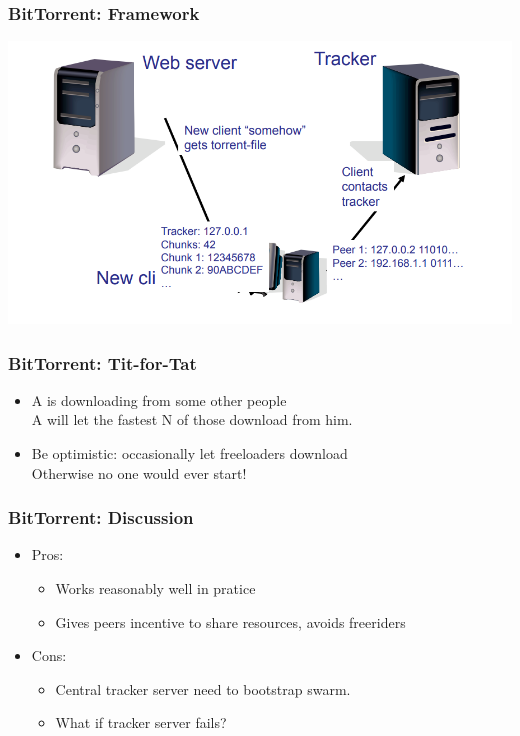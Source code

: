 \begin{frame}
    \frametitle{BitTorrent: Framework}
    \includegraphics[scale=0.3]{figures/bittorrent2.png}
\end{frame}

\begin{frame}
    \frametitle{BitTorrent: Tit-for-Tat}
    \begin{itemize}
        \item A is downloading from some other people \\
            A will let the fastest N of those download from him.
        \item Be optimistic: occasionally let freeloaders download \\
            Otherwise no one would ever start!
    \end{itemize}
\end{frame}

\begin{frame}
    \frametitle{BitTorrent: Discussion}
    \begin{itemize}
        \item Pros:
        \begin{itemize}
            \item Works reasonably well in pratice
            \item Gives peers incentive to share resources, avoids freeriders
        \end{itemize}
        \item Cons:
        \begin{itemize}
            \item Central tracker server need to bootstrap swarm.
            \item What if tracker server fails?
        \end{itemize}
    \end{itemize}
\end{frame}

